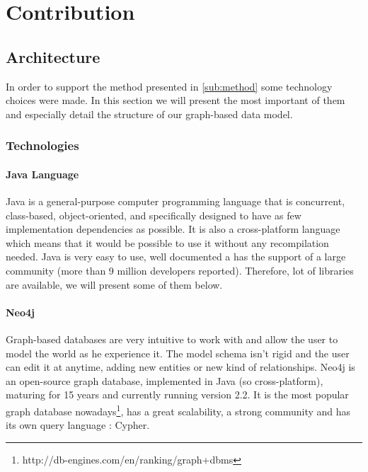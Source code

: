 \section{Contribution} %
\label{sec:contribution}

\subsection{Architecture} %
\label{sub:architecture}
In order to support the method presented in \ref{sub:method} some technology choices were made. In this section we will present the most important of them and especially detail the structure of our graph-based data model.
\subsubsection{Technologies} %
\label{ssub:technologies}
\paragraph{Java Language} %
\label{par:java_language}
Java is a general-purpose computer programming language that is concurrent, class-based, object-oriented, and specifically designed to have as few implementation dependencies as possible. It is also a cross-platform language which means that it would be possible to use it without any recompilation needed. Java is very easy to use, well documented a has the support of a large community (more than 9 million developers reported). Therefore, lot of libraries are available, we will present some of them below. 
\paragraph{Neo4j} %
\label{par:neo4j}
Graph-based databases are very intuitive to work with and allow the user to model the world as he experience it. The model schema isn't rigid and the user can edit it at anytime, adding new entities or new kind of relationships. Neo4j is an open-source graph database, implemented in Java (so cross-platform), maturing for 15 years and currently running version 2.2. It is the most popular graph database nowadays\footnote{http://db-engines.com/en/ranking/graph+dbms}, has a great scalability, a strong community and has its own query language : Cypher. 
